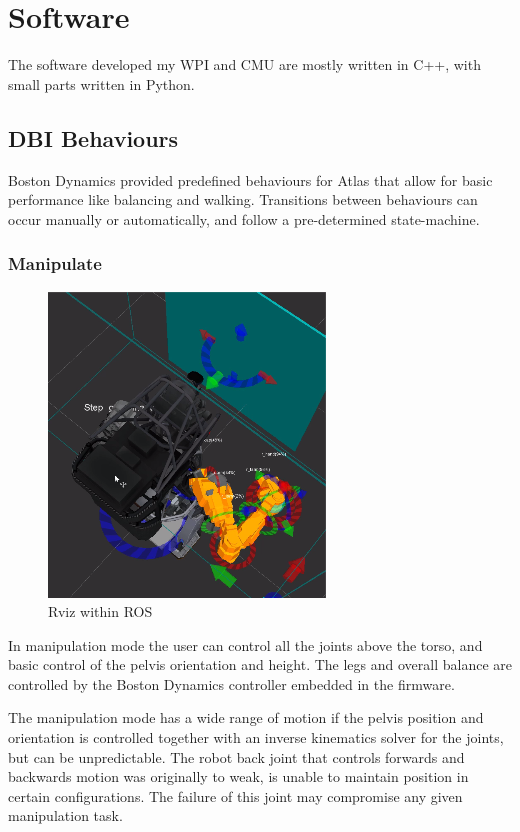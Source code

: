 \documentclass[12pt]{report}
\begin{document}
\section{Software}
The software developed my WPI and CMU are mostly written in C++, with small parts written in Python. 

\subsection{DBI Behaviours}
Boston Dynamics provided predefined behaviours for Atlas that allow for basic performance like balancing and walking. Transitions between behaviours can occur manually or automatically, and follow a pre-determined state-machine.

\subsubsection{Manipulate}
\begin{figure}
  \begin{center}
    \includegraphics[scale=0.5]{images/align_to_wall.png}
  \end{center}
  \caption{Rviz within ROS}
\end{figure}
In manipulation mode the user can control all the joints above the torso, and basic control of the pelvis orientation and height. The legs and overall balance are controlled by the Boston Dynamics controller embedded in the firmware.

The manipulation mode has a wide range of motion if the pelvis position and orientation is controlled together with an inverse kinematics solver for the joints, but can be unpredictable. The robot back joint that controls forwards and backwards motion was originally to weak, is unable to maintain position in certain configurations. The failure of this joint may compromise any given manipulation task.
\end{document}
